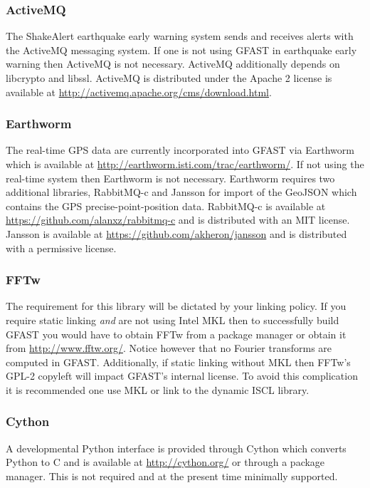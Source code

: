 \documentclass[12pt]{article}
\begin{document}
\subsubsection{ActiveMQ}
The ShakeAlert earthquake early warning system sends and receives alerts with the ActiveMQ
messaging system.  If one is not using GFAST in earthquake early warning then ActiveMQ
is not necessary.  ActiveMQ additionally depends on libcrypto and libssl.  ActiveMQ is
distributed under the Apache 2 license is available at
\url{http://activemq.apache.org/cms/download.html}. 

\subsubsection{Earthworm}
The real-time GPS data are currently incorporated into GFAST via Earthworm which is
available at \url{http://earthworm.isti.com/trac/earthworm/}.  If not using the real-time
system then Earthworm is not necessary.  Earthworm requires two
additional libraries, RabbitMQ-c and Jansson for import of the GeoJSON which contains the GPS
precise-point-position data.  RabbitMQ-c 
is available at \url{https://github.com/alanxz/rabbitmq-c} and is distributed with an 
MIT license.  Jansson is available at \url{https://github.com/akheron/jansson} and
is distributed with a permissive license. 

\subsubsection{FFTw}
The requirement for this library will be dictated by your linking policy.  If you require 
static linking \emph{and} are not using Intel MKL then to successfully build GFAST you would 
have to obtain FFTw from a package manager or obtain it from \url{http://www.fftw.org/}.
Notice however that no Fourier transforms are computed in GFAST.  Additionally, if static
linking without MKL then FFTw's GPL-2 copyleft will impact GFAST's internal license.
To avoid this complication it is recommended one use MKL or link to the dynamic ISCL library.  

\subsubsection{Cython}
A developmental Python interface is provided through Cython which converts Python to C and is 
available at \url{http://cython.org/} or through a package manager.  This is not required and
at the present time minimally supported.
\end{document}
